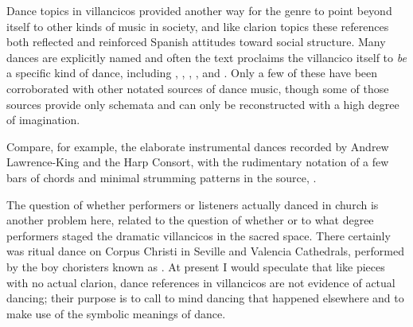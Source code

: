 Dance topics in villancicos provided another way for the genre to point beyond
itself to other kinds of music in society, and like clarion topics these
references both reflected and reinforced Spanish attitudes toward social
structure.
Many dances are explicitly named and often the text proclaims the villancico
itself to \emph{be} a specific kind of dance, including ,
, , , and
.%
    \citXXX[sources]
Only a few of these have been corroborated with other notated sources of dance
music, though some of those sources provide only schemata and can only be
reconstructed with a high degree of imagination.%
\begin{Footnote}
    Compare, for example, the elaborate instrumental dances recorded by Andrew
    Lawrence-King and the Harp Consort, 
    with the rudimentary notation of a few bars of chords and minimal strumming
    patterns in the source, .
\end{Footnote}
The question of whether performers or listeners actually danced in church is
another problem here, related to the question of whether or to what degree
performers staged the dramatic villancicos in the sacred space.%
    \citXXX[?]
There certainly was ritual dance on Corpus Christi in Seville and Valencia
Cathedrals, performed by the boy choristers known as .%
    \Autocite{Comes:Danzas}
At present I would speculate that like  pieces with no actual
clarion, dance references in villancicos are not evidence of actual dancing;
their purpose is to call to mind dancing that happened elsewhere and to make
use of the symbolic meanings of dance. %
	
